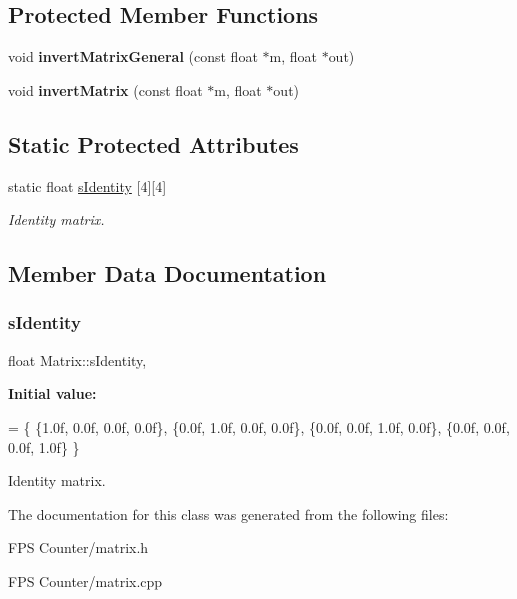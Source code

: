 \subsection*{Protected Member Functions}
\begin{DoxyCompactItemize}
\item 
\mbox{\label{class_matrix_af17b42f9e3862e58bbaa2f4c05e34194}} 
void {\bfseries invert\+Matrix\+General} (const float $\ast$m, float $\ast$out)
\item 
\mbox{\label{class_matrix_a58151836d856d798b4aa69075c3fabaf}} 
void {\bfseries invert\+Matrix} (const float $\ast$m, float $\ast$out)
\end{DoxyCompactItemize}
\subsection*{Static Protected Attributes}
\begin{DoxyCompactItemize}
\item 
static float \mbox{\hyperlink{class_matrix_ad2eec268a64adcfab4041b114d099106}{s\+Identity}} \mbox{[}4\mbox{]}\mbox{[}4\mbox{]}
\begin{DoxyCompactList}\small\item\em Identity matrix. \end{DoxyCompactList}\end{DoxyCompactItemize}


\subsection{Member Data Documentation}
\mbox{\label{class_matrix_ad2eec268a64adcfab4041b114d099106}} 
\subsubsection{\texorpdfstring{s\+Identity}{sIdentity}}
{\footnotesize\ttfamily float Matrix\+::s\+Identity\hspace{0.3cm}{\ttfamily [static]}, {\ttfamily [protected]}}

{\bfseries Initial value\+:}
\begin{DoxyCode}
=
\{
    \{1.0f, 0.0f, 0.0f, 0.0f\},
    \{0.0f, 1.0f, 0.0f, 0.0f\},
    \{0.0f, 0.0f, 1.0f, 0.0f\},
    \{0.0f, 0.0f, 0.0f, 1.0f\}
\}
\end{DoxyCode}


Identity matrix. 



The documentation for this class was generated from the following files\+:\begin{DoxyCompactItemize}
\item 
F\+P\+S Counter/matrix.\+h\item 
F\+P\+S Counter/matrix.\+cpp\end{DoxyCompactItemize}
